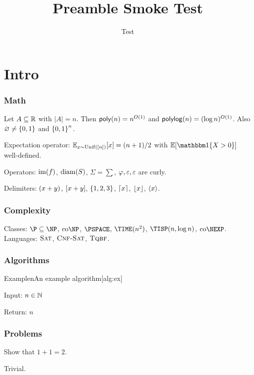 \documentclass{article}
\title{Preamble Smoke Test}
\author{Test}
\begin{document}
\maketitle
\tableofcontents

\part{Intro}
\section{Math}
Let $A \subseteq \mathbb{R}$ with $|A| = n$. Then $\operatorname{\mathsf{poly}}(n) = n^{O(1)}$ and $\operatorname{\mathsf{polylog}}(n) = (\log n)^{O(1)}$. Also $\emptyset \neq \zo$ and $\zon$.

Expectation operator: $\operatorname*{\mathbb{E}}_{x\sim \operatorname{Unif}([n])}[x] = (n+1)/2$ with $\EE[\ind\{X>0\}]$ well-defined.

Operators: $\operatorname{im}(f)$, $\operatorname{diam}(S)$, $\Sigma = \sum$, $\varphi, \varepsilon, \varepsilon$ are curly.

Delimiters: $\parof{x+y}$, $\braof{x+y}$, $\setof{1,2,3}$, $\ceilof{x}$, $\floorof{x}$, $\angof{x}$.

\section{Complexity}
Classes: $\P \subseteq \NP$, $\coNP$, $\PSPACE$, $\TIME(n^2)$, $\TISP(n,\log n)$, $\coNEXP$.
Languages: $\textsc{Sat}$, $\textsc{Cnf-Sat}$, $\textsc{Tqbf}$.

\section{Algorithms}
\begin{algo}{Example}{n}{An example algorithm}[alg:ex]
  \item Input: $n \in \mathbb{N}$
  \item Return: $n$
\end{algo}

\section{Problems}
\begin{prob}
Show that $1+1=2$.
\begin{soln}
Trivial.
\end{soln}
\end{prob}
\end{document}
